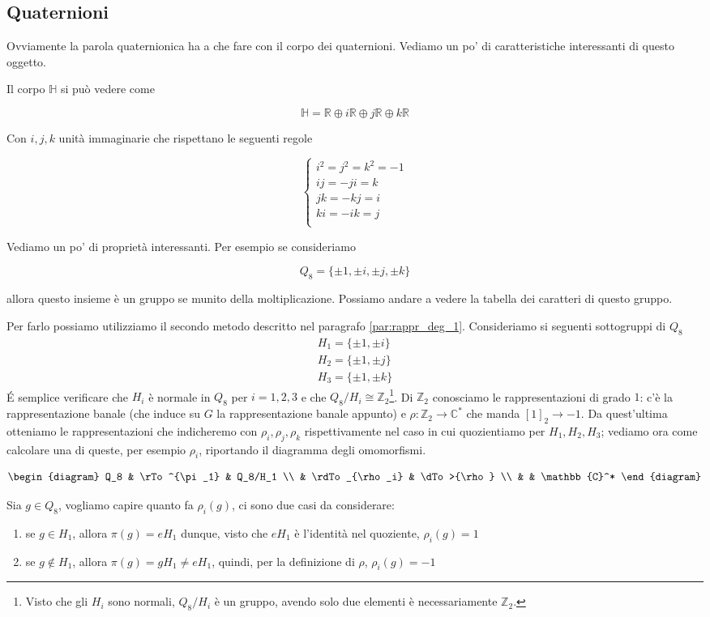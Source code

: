 \documentclass[11pt]{article}
\theoremstyle{plain}
\theoremstyle{definition}
\theoremstyle{remark}
\newcommand{\C}{\mathbb{C}}
\newcommand{\R}{\mathbb{R}}
\newcommand{\Z}{\mathbb{Z}}
\newcommand{\HH}{\mathbb{H}}
\newcommand{\tridiag}[6]{
	\[
	  \begin{diagram}
	  #1 & \rTo^{#2}  & #3        \\
	     & \rdTo_{#6} & \dTo>{#4}   \\
	     &          & #5
	  \end{diagram}
	\]
}
\begin{document}
\subsection{Quaternioni}

Ovviamente la parola quaternionica ha a che fare con il corpo dei quaternioni. Vediamo un po' di caratteristiche interessanti di questo oggetto.

Il corpo $\HH$ si può vedere come

\[\HH = \R \oplus i \R \oplus j \R \oplus k \R \]

Con $i,j,k$ unità immaginarie che rispettano le seguenti regole

\[ 
\begin{cases}
i^2 = j^2 = k^2 = -1 \\
ij = - ji = k \\
jk = -kj = i \\
ki = - ik = j \\
\end{cases}
\]


Vediamo un po' di proprietà interessanti. Per esempio se consideriamo 

\[ Q_8 =  \{\pm 1, \pm i, \pm j, \pm k \}\]

allora questo insieme è un gruppo se munito della moltiplicazione. Possiamo andare a vedere la tabella dei caratteri di questo gruppo. 


Per farlo possiamo utilizziamo il secondo metodo descritto nel paragrafo \eqref{par:rappr_deg_1}. Consideriamo si seguenti sottogruppi di $Q_8$
\begin{align*}
	H_1=\{ \pm1, \pm i \}\\
	H_2=\{ \pm1, \pm j \}\\
	H_3=\{ \pm1, \pm k \}
\end{align*}
\'E semplice verificare che $H_i$ è normale in $Q_8$ per $i=1,2,3$ e che $Q_8/H_i\cong \Z_2$\footnote{Visto che gli $H_i$ sono normali, $Q_8/H_i$ è un gruppo, avendo solo due elementi è necessariamente $\Z_2$.}. Di $\Z_2$ conosciamo le rappresentazioni di grado $1$: c'è la rappresentazione banale (che induce su $G$ la rappresentazione banale appunto) e $\rho:\Z_2\to \C^*$ che manda $[1]_2\to -1$. Da quest'ultima otteniamo le rappresentazioni che indicheremo con $\rho_i, \rho_j, \rho_k$ rispettivamente nel caso in cui quozientiamo per $H_1, H_2, H_3$; vediamo ora come calcolare una di queste, per esempio $\rho_i$, riportando il diagramma degli omomorfismi.
\tridiag {Q_8} {\pi_1} {Q_8/H_1} \rho {\C^*} {\rho_i}
Sia $g\in Q_8$, vogliamo capire quanto fa $\rho_i(g)$, ci sono due casi da considerare:
\begin{enumerate}
	\item se $g\in H_1$, allora $\pi(g) = eH_1$ dunque, visto che $eH_1$ è l'identità nel quoziente, $\rho_i(g)=1$
	\item se $g\not\in H_1$, allora $\pi(g) =gH_1\neq eH_1$, quindi, per la definizione di $\rho$, $\rho_i(g)=-1$
\end{enumerate}
\end{document}

